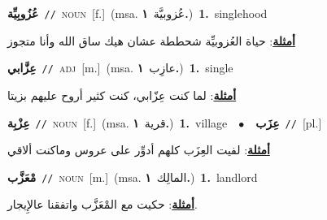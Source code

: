 \documentclass[10pt,a4paper,twoside]{article} %
\begin{document}
\begin{multicols}{2}
{\setlength\topsep{0pt}\textbf{\foreignlanguage{arabic}{عُزُوبِيِّة}}\ {\color{gray}\texttt{//}\color{black}}\ \textsc{noun}\ [f.]\ \color{gray}(msa. \foreignlanguage{arabic}{عُزوبيَّة}~\foreignlanguage{arabic}{\textbf{١.}})\color{black}\ \textbf{1.}~singlehood\  \begin{flushright}\color{gray}\foreignlanguage{arabic}{\textbf{\underline{\foreignlanguage{arabic}{أمثلة}}}: حياة العُزوبيِّة شحططة عشان هيك ساق الله وأنا متجوز}\end{flushright}\color{black}} \vspace{2mm}

{\setlength\topsep{0pt}\textbf{\foreignlanguage{arabic}{عِزَّابي}}\ {\color{gray}\texttt{//}\color{black}}\ \textsc{adj}\ [m.]\ \color{gray}(msa. \foreignlanguage{arabic}{عازِب}~\foreignlanguage{arabic}{\textbf{١.}})\color{black}\ \textbf{1.}~single\  \begin{flushright}\color{gray}\foreignlanguage{arabic}{\textbf{\underline{\foreignlanguage{arabic}{أمثلة}}}: لما كنت عِزّابي، كنت كثير أروح عليهم بزيتا}\end{flushright}\color{black}} \vspace{2mm}

{\setlength\topsep{0pt}\textbf{\foreignlanguage{arabic}{عِزْبِة}}\ {\color{gray}\texttt{//}\color{black}}\ \textsc{noun}\ [f.]\ \color{gray}(msa. \foreignlanguage{arabic}{قرية}~\foreignlanguage{arabic}{\textbf{١.}})\color{black}\ \textbf{1.}~village\ \ $\bullet$\ \ \setlength\topsep{0pt}\textbf{\foreignlanguage{arabic}{عِزَب}}\ {\color{gray}\texttt{//}\color{black}}\ [pl.]\  \begin{flushright}\color{gray}\foreignlanguage{arabic}{\textbf{\underline{\foreignlanguage{arabic}{أمثلة}}}: لفيت العِزَب كلهم أدوِّر على عروس وماكنت ألاقي}\end{flushright}\color{black}} \vspace{2mm}

{\setlength\topsep{0pt}\textbf{\foreignlanguage{arabic}{مْعَزَّب}}\ {\color{gray}\texttt{//}\color{black}}\ \textsc{noun}\ [m.]\ \color{gray}(msa. \foreignlanguage{arabic}{المالِك}~\foreignlanguage{arabic}{\textbf{١.}})\color{black}\ \textbf{1.}~landlord\  \begin{flushright}\color{gray}\foreignlanguage{arabic}{\textbf{\underline{\foreignlanguage{arabic}{أمثلة}}}: حكيت مع المْعَزَّب واتفقنا عالإِيجار.}\end{flushright}\color{black}} \vspace{2mm}


\end{multicols}
\end{document}
